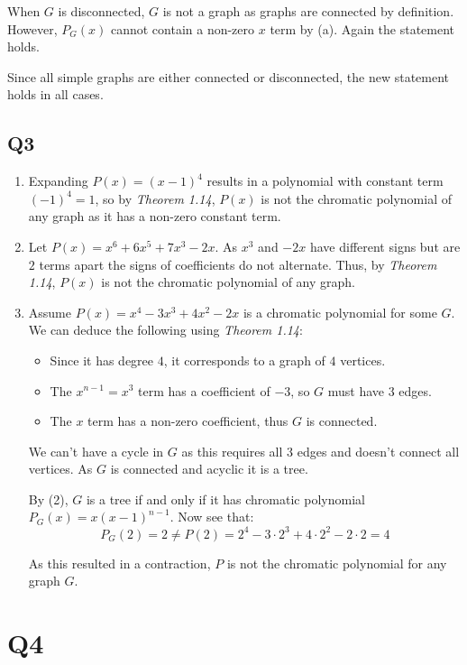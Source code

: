 \documentclass[a4paper, 11pt]{article}
\begin{document}
\begin{multicols*}{2}
\begin{enumerate}[label=(\alph*)]
		      When $G$ is disconnected, $G$ is not a graph as graphs are connected by definition. However, $P_G(x)$ cannot contain a non-zero $x$ term by (a). Again the statement holds.

		      Since all simple graphs are either connected or disconnected, the new statement holds in all cases.
	\end{enumerate}

	\subsection*{Q3}
	\begin{enumerate}[label=(\alph*)]
		\item Expanding $P(x)=(x-1)^4$ results in a polynomial with constant term $(-1)^4=1$, so by \textit{Theorem 1.14}, $P(x)$ is not the chromatic polynomial of any graph as it has a non-zero constant term.

		\item Let $P(x)=x^6+6x^5+7x^3-2x$. As $x^3$ and $-2x$ have different signs but are $2$ terms apart the signs of coefficients do not alternate. Thus, by \textit{Theorem 1.14}, $P(x)$ is not the chromatic polynomial of any graph.

		\item Assume $P(x)=x^4-3x^3+4x^2-2x$ is a chromatic polynomial for some $G$. We can deduce the following using \textit{Theorem 1.14}:
		      \begin{itemize}
			      \item Since it has degree $4$, it corresponds to a graph of $4$ vertices.
			      \item The $x^{n-1}=x^3$ term has a coefficient of $-3$, so $G$ must have $3$ edges.
			      \item The $x$ term has a non-zero coefficient, thus $G$ is connected.
		      \end{itemize}
		      We can't have a cycle in $G$ as this requires all $3$ edges and doesn't connect all vertices. As $G$ is connected and acyclic it is a tree.

		      By (2), $G$ is a tree if and only if it has chromatic polynomial $P_G(x)=x(x-1)^{n-1}$. Now see that:
		      $$P_G(2)=2 \neq P(2)= 2^4 - 3\cdot 2^3 + 4 \cdot 2^2 - 2\cdot 2 = 4$$

		      As this resulted in a contraction, $P$ is not the chromatic polynomial for any graph $G$.
	\end{enumerate}

	\section*{Q4}


\end{multicols*}
\end{document}
